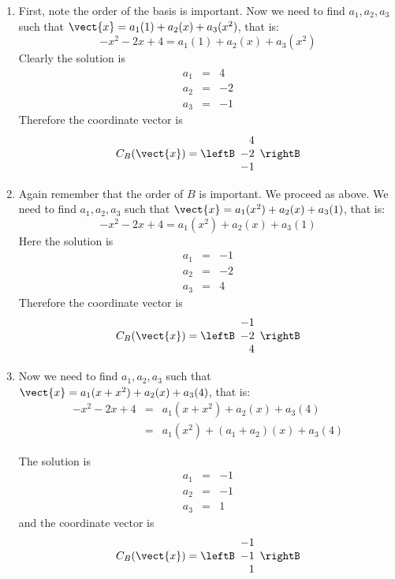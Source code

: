 \begin{solution}
\begin{enumerate}
\item
First, note the order of the basis is important.
Now we need to find $a_1, a_2, a_3$ such that $\vect{x} = a_1 (1) + a_2 (x) + a_3(x^2)$, that is:
\[
-x^2 -2x + 4 = a_1 (1) + a_2 (x) + a_3(x^2)
\]
Clearly the solution is
\begin{eqnarray*}
a_1 &=& 4 \\
a_2 &=& -2 \\
a_3 &=& -1
\end{eqnarray*}
Therefore the coordinate vector is
\[
C_B(\vect{x}) = 
\leftB
\begin{array}{r}
4 \\
-2 \\
-1
\end{array} \rightB
\]

\item
Again remember that the order of $B$ is important. We proceed as above. 
We need to find $a_1, a_2, a_3$ such that $\vect{x} = a_1 (x^2) + a_2 (x) + a_3(1)$, that is:
\[
-x^2 -2x + 4 = a_1 (x^2) + a_2 (x) + a_3(1)
\]
Here the solution is
\begin{eqnarray*}
a_1 &=& -1 \\
a_2 &=& -2 \\
a_3 &=& 4
\end{eqnarray*}
Therefore the coordinate vector is
\[
C_B(\vect{x}) = 
\leftB
\begin{array}{r}
-1 \\
-2 \\
4
\end{array} \rightB
\]

\item 
Now we need to find $a_1, a_2, a_3$ such that $\vect{x} = a_1 (x + x^2) + a_2 (x) + a_3(4)$, that is:
\begin{eqnarray*}
-x^2 -2x + 4 &=& a_1 (x + x^2 ) + a_2 (x) + a_3(4)\\
&=& a_1 (x^2) + (a_1 + a_2) (x) + a_3(4)
\end{eqnarray*}

The solution is
\begin{eqnarray*}
a_1 &=& -1 \\
a_2 &=& -1 \\
a_3 &=& 1
\end{eqnarray*}
and the coordinate vector is
\[
C_B(\vect{x}) = 
\leftB
\begin{array}{r}
-1 \\
-1 \\
1
\end{array} \rightB
\]
\end{enumerate}
\end{solution}

